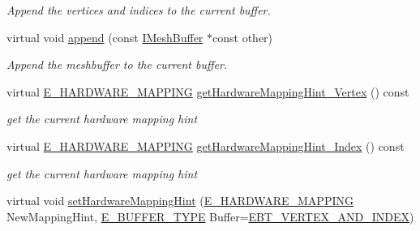 \begin{DoxyCompactItemize}
\begin{DoxyCompactList}\small\item\em Append the vertices and indices to the current buffer. \end{DoxyCompactList}\item 
virtual void \hyperlink{classirr_1_1scene_1_1CMeshBuffer_af48b88e6c1bd79e6abd6a6803aa106c0}{append} (const \hyperlink{classirr_1_1scene_1_1IMeshBuffer}{I\+Mesh\+Buffer} $\ast$const other)
\begin{DoxyCompactList}\small\item\em Append the meshbuffer to the current buffer. \end{DoxyCompactList}\item 
\mbox{\label{classirr_1_1scene_1_1CMeshBuffer_adae334e8431e647d837acda0fada8bd5}} 
virtual \hyperlink{namespaceirr_1_1scene_ac7d8ee8d77da75f2580bb9bb17231c27}{E\+\_\+\+H\+A\+R\+D\+W\+A\+R\+E\+\_\+\+M\+A\+P\+P\+I\+NG} \hyperlink{classirr_1_1scene_1_1CMeshBuffer_adae334e8431e647d837acda0fada8bd5}{get\+Hardware\+Mapping\+Hint\+\_\+\+Vertex} () const
\begin{DoxyCompactList}\small\item\em get the current hardware mapping hint \end{DoxyCompactList}\item 
\mbox{\label{classirr_1_1scene_1_1CMeshBuffer_a3f6eb99f71576b72225ac3eccd68efbe}} 
virtual \hyperlink{namespaceirr_1_1scene_ac7d8ee8d77da75f2580bb9bb17231c27}{E\+\_\+\+H\+A\+R\+D\+W\+A\+R\+E\+\_\+\+M\+A\+P\+P\+I\+NG} \hyperlink{classirr_1_1scene_1_1CMeshBuffer_a3f6eb99f71576b72225ac3eccd68efbe}{get\+Hardware\+Mapping\+Hint\+\_\+\+Index} () const
\begin{DoxyCompactList}\small\item\em get the current hardware mapping hint \end{DoxyCompactList}\item 
\mbox{\label{classirr_1_1scene_1_1CMeshBuffer_aa86cd9ffbe81c9f86a6096b2e5d3410e}} 
virtual void \hyperlink{classirr_1_1scene_1_1CMeshBuffer_aa86cd9ffbe81c9f86a6096b2e5d3410e}{set\+Hardware\+Mapping\+Hint} (\hyperlink{namespaceirr_1_1scene_ac7d8ee8d77da75f2580bb9bb17231c27}{E\+\_\+\+H\+A\+R\+D\+W\+A\+R\+E\+\_\+\+M\+A\+P\+P\+I\+NG} New\+Mapping\+Hint, \hyperlink{namespaceirr_1_1scene_a8f59a89ffef0ad8e5b2c2cb874a93e8c}{E\+\_\+\+B\+U\+F\+F\+E\+R\+\_\+\+T\+Y\+PE} Buffer=\hyperlink{namespaceirr_1_1scene_a8f59a89ffef0ad8e5b2c2cb874a93e8ca833624730c30cffccc121fe31aa0832c}{E\+B\+T\+\_\+\+V\+E\+R\+T\+E\+X\+\_\+\+A\+N\+D\+\_\+\+I\+N\+D\+EX})

\end{DoxyCompactItemize}
